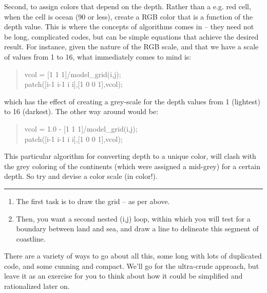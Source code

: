 \documentclass{tufte-book} %
\newenvironment{docspec}{\begin{quotation}\ttfamily\parskip0pt\parindent0pt\ignorespaces}{\end{quotation}}
\begin{document}
Second, to assign colors that depend on the depth. Rather than a e.g. red cell, when the cell is ocean (90 or less), create a RGB color that is a function of the depth value. This is where the concepts of algorithms comes in -- they need not be long, complicated codes, but can be simple equations that achieve the desired result. For instance, given the nature of the RGB scale, and that we have a scale of values from 1 to 16, what immediately comes to mind is:
\begin{docspec}
vcol = [1 1 1]/model\_grid(i,j);\\
patch([i-1 i-1 i i],[1 0 0 1],vcol);
\end{docspec}
which has the effect of creating a grey-scale for the depth values from 1 (lightest) to 16 (darkest). The other way around would be:
\begin{docspec}
vcol = 1.0 - [1 1 1]/model\_grid(i,j);\\
patch([i-1 i-1 i i],[1 0 0 1],vcol);
\end{docspec}

This particular algorithm for converting depth to a unique color, will clash with the grey coloring of the continents (which were assigned a mid-grey) for a certain depth. So try and devise a color scale (in color!). 

\vspace{1mm}
\noindent\rule{4cm}{0.5pt}
\vspace{-2mm}


\begin{enumerate}[noitemsep]
\setlength{\itemindent}{.2in}
\item The first task is to draw the grid -- as per above.
\item Then, you want a second nested (i,j) loop, within which you will test for a boundary between land and sea, and draw a line to delineate this segment of coastline.
\end{enumerate}

There are a variety of ways to go about all this, some long with lots of duplicated code, and some cunning and compact. We'll go for the ultra-crude approach, but leave it as an exercise for you to think about how it could be simplified and rationalized later on.
\end{document}
